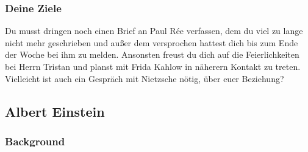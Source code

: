 \documentclass[12pt, a4paper, openany]{report}
\begin{document}
\subsubsection{Deine Ziele}
Du musst dringen noch einen Brief an Paul Rée verfassen, dem du viel zu lange nicht mehr geschrieben und außer dem versprochen hattest dich bis zum Ende der Woche bei ihm zu melden. 
Ansonsten freust du dich auf die Feierlichkeiten bei Herrn Tristan und planst
mit Frida Kahlow in näherern Kontakt zu treten. 
Vielleicht ist auch ein Gespräch mit Nietzsche nötig, über euer Beziehung?

\subsection{Albert Einstein}
\subsubsection{Background}
\end{document}
